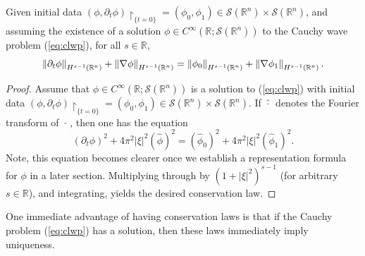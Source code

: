 \documentclass{article}
\begin{document}
\begin{corollary}
	Given initial data $(\phi, \partial_{t}\phi)\upharpoonright_{\{t = 0\}} = (\phi_{0}, \phi_{1}) \in \mathcal{S}(\mathbb{R}^{n}) \times \mathcal{S}(\mathbb{R}^{n})$, and assuming the existence of a solution $\phi \in C^{\infty}(\mathbb{R}; \mathcal{S}(\mathbb{R}^{n}))$ to the Cauchy wave problem (\ref{eq:clwp}), for all $s \in \mathbb{R}$, 
	\begin{equation}
		\left\Vert \partial_{t}\phi \right\Vert_{H^{s - 1}(\mathbb{R}^{n})} + \left\Vert \nabla \phi \right\Vert_{H^{s - 1}(\mathbb{R}^{n})} = \left\Vert \phi_{0} \right\Vert_{H^{s - 1}(\mathbb{R}^{n})} + \left\Vert \nabla \phi_{1} \right\Vert_{H^{s - 1}(\mathbb{R}^{n})}. 
	\end{equation}   
\end{corollary}
\begin{proof}
	Assume that $\phi \in C^{\infty}(\mathbb{R}; \mathcal{S}(\mathbb{R}^{n}))$ is a solution to (\ref{eq:clwp}) with initial data $(\phi, \partial_{t}\phi)\upharpoonright_{\{t = 0\}} = (\phi_{0}, \phi_{1}) \in \mathcal{S}(\mathbb{R}^{n}) \times \mathcal{S}(\mathbb{R}^{n})$. If $\hat{\hspace{2pt}\cdot\hspace{2pt}}$ denotes the Fourier transform of $\hspace{2pt}\cdot\hspace{2pt}$, then one has the equation
	\begin{equation*}
		(\partial_{t}\phi)^{2} + 4\pi^{2}|\xi|^{2}(\hat{\phi})^{2} = (\hat{\phi}_{0})^{2} + 4\pi^{2}|\xi|^{2}(\hat{\phi}_{1})^{2}.
	\end{equation*} 
	Note, this equation becomes clearer once we establish a representation formula for $\phi$ in a later section. Multiplying through by $(1 + |\xi|^{2})^{s - 1}$ (for arbitrary $s \in \mathbb{R}$), and integrating, yields the desired conservation law. 
\end{proof}

One immediate advantage of having conservation laws is that if the Cauchy problem (\ref{eq:clwp}) has a solution, then these laws immediately imply uniqueness. 
\end{document}
